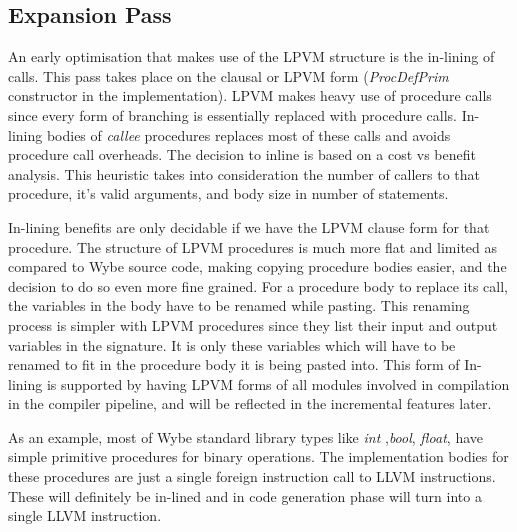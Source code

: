 \subsection{Expansion Pass}

An early optimisation that makes use of the LPVM structure is the in-lining of
calls. This pass takes place on the clausal or LPVM form (\textit{ProcDefPrim}
constructor in the implementation). LPVM makes heavy use of procedure calls
since every form of branching is essentially replaced with procedure
calls. In-lining bodies of \textit{callee} procedures replaces most of these
calls and avoids procedure call overheads. The decision to inline is based on a
cost vs benefit analysis. This heuristic takes into consideration the number of
callers to that procedure, it's valid arguments, and body size in number of
statements.

In-lining benefits are only decidable if we have the LPVM clause form for that
procedure. The structure of LPVM procedures is much more flat and limited as
compared to Wybe source code, making copying procedure bodies easier, and the
decision to do so even more fine grained. For a procedure body to replace its
call, the variables in the body have to be renamed while pasting. This renaming
process is simpler with LPVM procedures since they list their input and output
variables in the signature. It is only these variables which will have to be
renamed to fit in the procedure body it is being pasted into. This form of
In-lining is supported by having LPVM forms of all modules involved in
compilation in the compiler pipeline, and will be reflected in the incremental
features later. 

As an example, most of Wybe standard library types like \textit{int}
,\textit{bool}, \textit{float}, have simple primitive procedures for binary
operations. The implementation bodies for these procedures are just a single
foreign instruction call to LLVM instructions. These will definitely be
in-lined and in code generation phase will turn into a single LLVM instruction.




